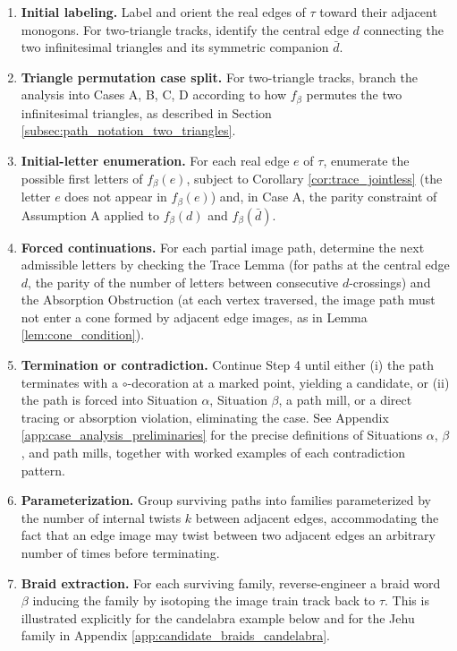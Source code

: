 \begin{enumerate}
    \item \textbf{Initial labeling.} Label and orient the real edges of $\tau$ toward their adjacent monogons. For two-triangle tracks, identify the central edge $d$ connecting the two infinitesimal triangles and its symmetric companion $\bar{d}$.
    
    \item \textbf{Triangle permutation case split.} For two-triangle tracks, branch the analysis into Cases A, B, C, D according to how $f_\beta$ permutes the two infinitesimal triangles, as described in Section \ref{subsec:path_notation_two_triangles}.
    
    \item \textbf{Initial-letter enumeration.} For each real edge $e$ of $\tau$, enumerate the possible first letters of $f_\beta(e)$, subject to Corollary \ref{cor:trace_jointless} (the letter $e$ does not appear in $f_\beta(e)$) and, in Case A, the parity constraint of Assumption A applied to $f_\beta(d)$ and $f_\beta(\bar{d})$.
    
    \item \textbf{Forced continuations.} For each partial image path, determine the next admissible letters by checking the Trace Lemma (for paths at the central edge $d$, the parity of the number of letters between consecutive $d$-crossings) and the Absorption Obstruction (at each vertex traversed, the image path must not enter a cone formed by adjacent edge images, as in Lemma \ref{lem:cone_condition}).
    
    \item \textbf{Termination or contradiction.} Continue Step 4 until either (i) the path terminates with a $\circ$-decoration at a marked point, yielding a candidate, or (ii) the path is forced into Situation $\alpha$, Situation $\beta$, a path mill, or a direct tracing or absorption violation, eliminating the case. See Appendix \ref{app:case_analysis_preliminaries} for the precise definitions of Situations $\alpha$, $\beta$, and path mills, together with worked examples of each contradiction pattern.
    
    \item \textbf{Parameterization.} Group surviving paths into families parameterized by the number of internal twists $k$ between adjacent edges, accommodating the fact that an edge image may twist between two adjacent edges an arbitrary number of times before terminating.
    
    \item \textbf{Braid extraction.} For each surviving family, reverse-engineer a braid word $\beta$ inducing the family by isotoping the image train track back to $\tau$. This is illustrated explicitly for the candelabra example below and for the Jehu family in Appendix \ref{app:candidate_braids_candelabra}.
\end{enumerate}

